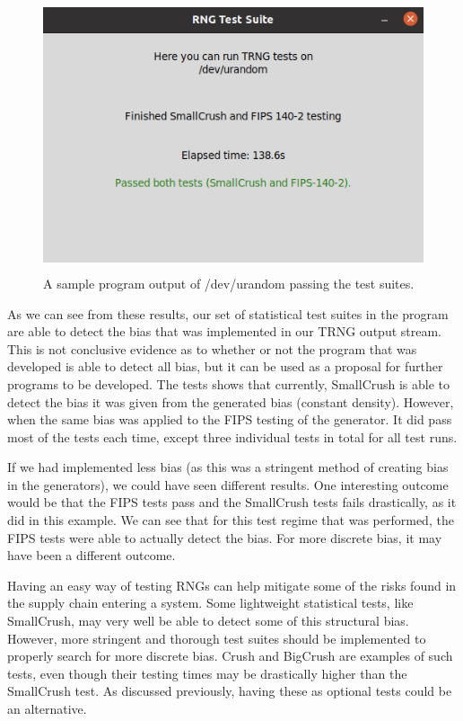 \documentclass[]{final_report}
\begin{document}
\begin{figure}[h!]
\begin{center}
\includegraphics[height=8cm]{program_cutout_pass}
\caption{A sample program output of /dev/urandom passing the test suites.}
\label{fig:program_cutout_pass}
\end{center}
\end{figure}

\par{As we can see from these results, our set of statistical test suites in the program are able to detect the bias that was implemented in our TRNG output stream. This is not conclusive evidence as to whether or not the program that was developed is able to detect all bias, but it can be used as a proposal for further programs to be developed. The tests shows that currently, SmallCrush is able to detect the bias it was given from the generated bias (constant density). However, when the same bias was applied to the FIPS testing of the generator. It did pass most of the tests each time, except three individual tests in total for all test runs.}

\par{If we had implemented less bias (as this was a stringent method of creating bias in the generators), we could have seen different results. One interesting outcome would be that the FIPS tests pass and the SmallCrush tests fails drastically, as it did in this example. We can see that for this test regime that was performed, the FIPS tests were able to actually detect the bias. For more discrete bias, it may have been a different outcome.}

\par{Having an easy way of testing RNGs can help mitigate some of the risks found in the supply chain entering a system. Some lightweight statistical tests, like SmallCrush, may very well be able to detect some of this structural bias. However, more stringent and thorough test suites should be implemented to properly search for more discrete bias. Crush and BigCrush are examples of such tests, even though their testing times may be drastically higher than the SmallCrush test. As discussed previously, having these as optional tests could be an alternative.}
\end{document}
